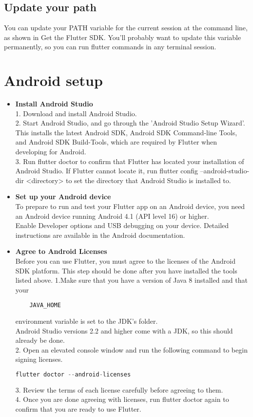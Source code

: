 \subsection{Update your path}
You can update your PATH variable for the current session at the command line, as shown in Get the Flutter SDK.
You'll probably want to update this variable permanently, so you can run flutter commands in any terminal session.

\section{Android setup}
\begin{itemize}
	\item \textbf{Install Android Studio}\\
	1. Download and install Android Studio.\\
	2. Start Android Studio, and go through the 'Android Studio Setup Wizard'. This installs the latest Android SDK, Android SDK Command-line Tools, and Android SDK Build-Tools, which are required by Flutter when developing for Android.\\
	3. Run flutter doctor to confirm that Flutter has located your installation of Android Studio. If Flutter cannot locate it, run flutter config --android-studio-dir <directory> to set the directory that Android Studio is installed to.\\
	\item \textbf{Set up your Android device}\\
	To prepare to run and test your Flutter app on an Android device, you need an Android device running Android 4.1 (API level 16) or higher.\\
	Enable Developer options and USB debugging on your device. Detailed instructions are available in the Android documentation.\\
	\item \textbf{ Agree to Android Licenses}\\
	Before you can use Flutter, you must agree to the licenses of the Android SDK platform. This step should be done after you have installed the tools listed above.
	1.Make sure that you have a version of Java 8 installed and that your 
	\begin{lstlisting}
	JAVA_HOME \end{lstlisting}
	 environment variable is set to the JDK’s folder.\\
	Android Studio versions 2.2 and higher come with a JDK, so this should already be done.  \\
	2. Open an elevated console window and run the following command to begin signing licenses.
	\begin{lstlisting}[language=C]
		flutter doctor --android-licenses\end{lstlisting}
	3. Review the terms of each license carefully before agreeing to them.\\
	4. Once you are done agreeing with licenses, run flutter doctor again to confirm that you are ready to use Flutter.\\	
\end{itemize}
